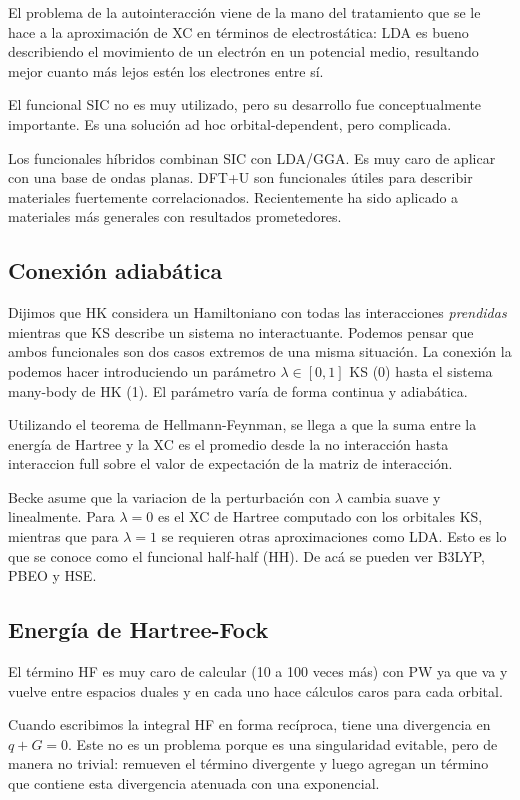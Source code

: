   El problema de la autointeracción viene de la mano del tratamiento que se le hace a la aproximación de XC en términos de electrostática: LDA es bueno describiendo el movimiento de un electrón en un potencial medio, resultando mejor cuanto más lejos estén los electrones entre sí.

  El funcional SIC no es muy utilizado, pero su desarrollo fue conceptualmente importante. Es una solución ad hoc orbital-dependent, pero complicada.

  Los funcionales híbridos combinan SIC con LDA/GGA. Es muy caro de aplicar con una base de ondas planas. DFT+U son funcionales útiles para describir materiales fuertemente correlacionados. Recientemente ha sido aplicado a materiales más generales con resultados prometedores.

\subsection{Conexión adiabática}

  Dijimos que HK considera un Hamiltoniano con todas las interacciones \emph{prendidas} mientras que KS describe un sistema no interactuante. Podemos pensar que ambos funcionales son dos casos extremos de una misma situación. La conexión la podemos hacer introduciendo un parámetro $\lambda \in[0,1]$ KS (0) hasta el sistema many-body de HK (1). El parámetro varía de forma continua y adiabática.

  Utilizando el teorema de Hellmann-Feynman, se llega a que la suma entre la energía de Hartree y la XC es el promedio desde la no interacción hasta interaccion full sobre el valor de expectación de la matriz de interacción.

  Becke asume que la variacion de la perturbación con $\lambda$ cambia suave y linealmente. Para $\lambda=0$ es el XC de Hartree computado con los orbitales KS, mientras que para $\lambda=1$ se requieren otras aproximaciones como LDA. Esto es lo que se conoce como el funcional half-half (HH). De acá se pueden ver B3LYP, PBEO y HSE.

\subsection{Energía de Hartree-Fock}

  El término HF es muy caro de calcular (10 a 100 veces más) con PW ya que va y vuelve entre espacios duales y en cada uno hace cálculos caros para cada orbital.

  Cuando escribimos la integral HF en forma recíproca, tiene una divergencia en $q+G=0$. Este no es un problema porque es una singularidad evitable, pero de manera no trivial: remueven el término divergente y luego agregan un término que contiene esta divergencia atenuada con una exponencial.

